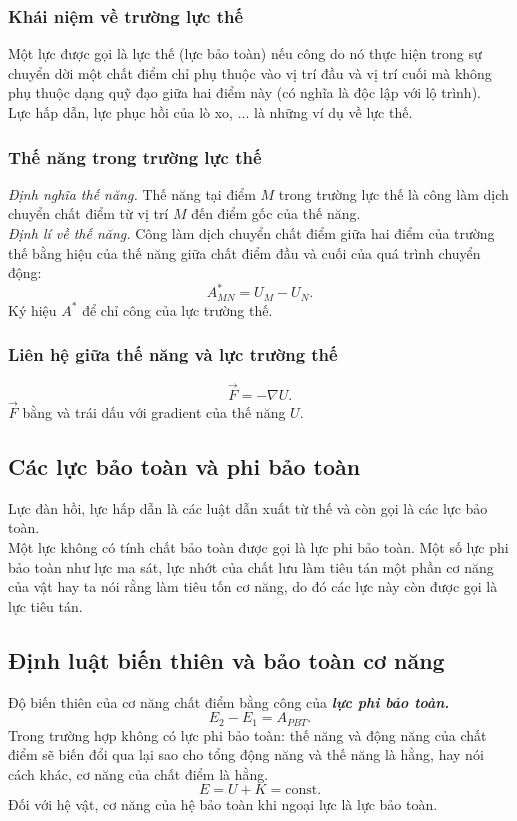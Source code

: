 \subsubsection{Khái niệm về trường lực thế}
Một lực được gọi là lực thế (lực bảo toàn) nếu công do nó thực hiện trong sự chuyển dời một chất điểm chỉ phụ thuộc vào vị trí đầu và vị trí cuối mà không phụ thuộc dạng quỹ đạo giữa hai điểm này (có nghĩa là độc lập với lộ trình).\\
Lực hấp dẫn, lực phục hồi của lò xo, ... là những ví dụ về lực thế.
\subsubsection{Thế năng trong trường lực thế}
\textit{Định nghĩa thế năng.} Thế năng tại điểm $M$ trong trường lực thế là công làm dịch chuyển chất điểm từ vị trí $M$ đến điểm gốc của thế năng.\\
\textit{Định lí về thế năng.}
Công làm dịch chuyển chất điểm giữa hai điểm của trường thế bằng hiệu của thế năng giữa chất điểm đầu và cuối của quá trình chuyển động:
$$A_{MN}^ *  = {U_M} - {U_N}.$$
Ký hiệu $A^*$ để chỉ công của lực trường thế.
\subsubsection{Liên hệ giữa thế năng và lực trường thế}
$$\overrightarrow{F} = - \nabla U.$$
$\overrightarrow{F}$ bằng và trái dấu với gradient của thế năng $U.$
\subsection{Các lực bảo toàn và phi bảo toàn}
Lực đàn hồi, lực hấp dẫn là các luật dẫn xuất từ thế và còn gọi là các lực bảo toàn.\\
Một lực không có tính chất bảo toàn được gọi là lực phi bảo toàn. Một số lực phi bảo toàn như lực ma sát, lực nhớt của chất lưu làm tiêu tán một phần cơ năng của vật hay ta nói rằng làm tiêu tốn cơ năng, do đó các lực này còn được gọi là lực tiêu tán.
\subsection{Định luật biến thiên và bảo toàn cơ năng}
Độ biến thiên của cơ năng chất điểm bằng công của \textbf{\textit{lực phi bảo toàn.}}
$$E_2 - E_1 = A_{PBT}.$$
Trong trường hợp không có lực phi bảo toàn: thế năng và động năng của chất điểm sẽ biến đổi qua lại sao cho tổng động năng và thế năng là hằng, hay nói cách khác, cơ năng của chất điểm là hằng.
$$E = U + K = \mathrm{const}.$$
Đối với hệ vật, cơ năng của hệ bảo toàn khi ngoại lực là lực bảo toàn.
